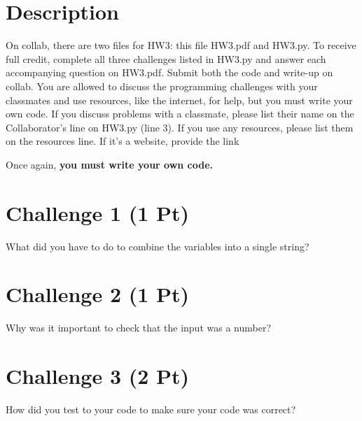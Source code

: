 \documentclass{article}
\begin{document}
\pagestyle{fancy}

\section*{Description}
On collab, there are two files for HW3: this file HW3.pdf and HW3.py. To receive full credit, complete
all three challenges listed in HW3.py and answer each accompanying question on HW3.pdf. Submit
both the code and write-up on collab. You are allowed to discuss the programming challenges with
your classmates and use resources, like the internet, for help, but you must write your own code.
If you discuss problems with a classmate, please list their name on the Collaborator’s line on HW3.py
(line 3). If you use any resources, please list them on the resources line. If it’s a website, provide
the link

\bigskip

\begin{center}
Once again, \textbf{you must write your own code.}    
\end{center}

\section*{Challenge 1 (1 Pt)}
What did you have to do to combine the variables into a single string?
\vspace*{2.5in}

\section*{Challenge 2 (1 Pt)}
Why was it important to check that the input was a number?
\vspace*{2.5in}

\section*{Challenge 3 (2 Pt)}
How did you test to your code to make sure your code was correct?
\end{document}
